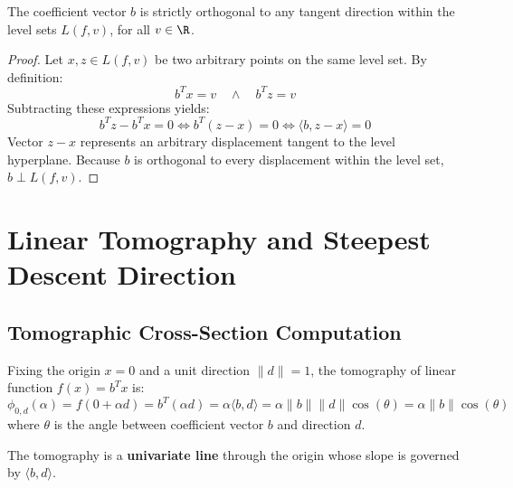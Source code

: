 \begin{theorem}
The coefficient vector $b$ is strictly orthogonal to any tangent direction within the level sets $L(f, v)$, for all $v \in \R$.
\end{theorem}

\begin{proof}
Let $x, z \in L(f, v)$ be two arbitrary points on the same level set. By definition:
\begin{equation}
b^T x = v \quad \land \quad b^T z = v
\end{equation}
Subtracting these expressions yields:
\begin{equation}
b^T z - b^T x = 0 \iff b^T (z - x) = 0 \iff \langle b, z - x \rangle = 0
\end{equation}
Vector $z - x$ represents an arbitrary displacement tangent to the level hyperplane. Because $b$ is orthogonal to every displacement within the level set, $b \perp L(f, v)$.
\end{proof}


\FloatBarrier
\section{Linear Tomography and Steepest Descent Direction}
\label{sec:opt-linear-tomography-steepest-descent-en}

\subsection{Tomographic Cross-Section Computation}
Fixing the origin $x = 0$ and a unit direction $\|d\| = 1$, the tomography of linear function $f(x) = b^T x$ is:
\begin{equation}
\phi_{0, d}(\alpha) = f(0 + \alpha d) = b^T (\alpha d) = \alpha \langle b, d \rangle = \alpha \|b\| \|d\| \cos(\theta) = \alpha \|b\| \cos(\theta)
\end{equation}
where $\theta$ is the angle between coefficient vector $b$ and direction $d$.

The tomography is a \textbf{univariate line} through the origin whose slope is governed by $\langle b, d \rangle$.


